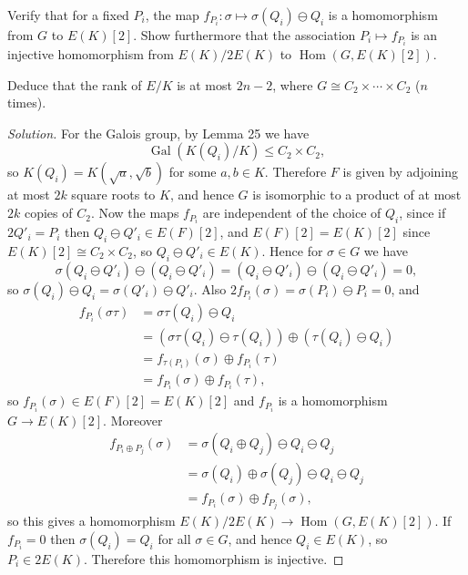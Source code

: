 \documentclass[a4paper]{article}
\theoremstyle{plain}
\theoremstyle{remark}
\theoremstyle{definition}
\DeclareMathOperator{\Hom}{Hom}
\DeclareMathOperator{\Gal}{Gal}
\begin{document}
\begin{enumerate}
        Verify that for a fixed $P_i$, the map
        $f_{P_i}:\sigma\mapsto\sigma(Q_i)\ominus Q_i$ is a homomorphism from $G$
        to $E(K)[2]$. Show furthermore that the association $P_i\mapsto f_{P_i}$
        is an injective homomorphism from $E(K)/2E(K)$ to $\Hom(G,E(K)[2])$.

        Deduce that the rank of $E/K$ is at most $2n-2$, where
        $G\cong C_2\times\cdots\times C_2$ ($n$ times).

        \begin{proof}[Solution]
            For the Galois group, by Lemma 25 we have
            \begin{equation*}
                \Gal(K(Q_i)/K)\le C_2\times C_2,
            \end{equation*}
            so $K(Q_i)=K(\sqrt a,\sqrt b)$ for some $a,b\in K$. Therefore $F$ is
            given by adjoining at most $2k$ square roots to $K$, and hence $G$
            is isomorphic to a product of at most $2k$ copies of $C_2$. Now the
            maps $f_{P_i}$ are independent of the choice of $Q_i$, since if
            $2Q'_i=P_i$ then $Q_i\ominus Q'_i\in E(F)[2]$, and $E(F)[2]=E(K)[2]$
            since $E(K)[2]\cong C_2\times C_2$, so $Q_i\ominus Q'_i\in E(K)$.
            Hence for $\sigma\in G$ we have
            \begin{equation*}
                \sigma(Q_i\ominus Q'_i)\ominus(Q_i\ominus Q'_i)
                    = (Q_i\ominus Q'_i)\ominus(Q_i\ominus Q'_i)
                    = 0,
            \end{equation*}
            so $\sigma(Q_i)\ominus Q_i=\sigma(Q'_i)\ominus Q'_i$. Also
            $2f_{P_i}(\sigma)=\sigma(P_i)\ominus P_i=0$, and
            \begin{align*}
                f_{P_i}(\sigma\tau)
                    &= \sigma\tau(Q_i)\ominus Q_i \\
                    &= (\sigma\tau(Q_i)\ominus\tau(Q_i))
                        \oplus (\tau(Q_i)\ominus Q_i) \\
                    &= f_{\tau(P_i)}(\sigma) \oplus f_{P_i}(\tau) \\
                    &= f_{P_i}(\sigma) \oplus f_{P_i}(\tau),
            \end{align*}
            so $f_{P_i}(\sigma)\in E(F)[2]=E(K)[2]$ and $f_{P_i}$ is a
            homomorphism $G\to E(K)[2]$. Moreover
            \begin{align*}
                f_{P_i\oplus P_j}(\sigma)
                    &= \sigma(Q_i\oplus Q_j)\ominus Q_i\ominus Q_j \\
                    &= \sigma(Q_i)\oplus\sigma(Q_j)\ominus Q_i\ominus Q_j \\
                    &= f_{P_i}(\sigma)\oplus f_{P_j}(\sigma),
            \end{align*}
            so this gives a homomorphism $E(K)/2E(K)\to\Hom(G,E(K)[2])$. If
            $f_{P_i}=0$ then $\sigma(Q_i)=Q_i$ for all $\sigma\in G$, and hence
            $Q_i\in E(K)$, so $P_i\in 2E(K)$. Therefore this homomorphism is
            injective.


\end{proof}
\end{enumerate}
\end{document}
